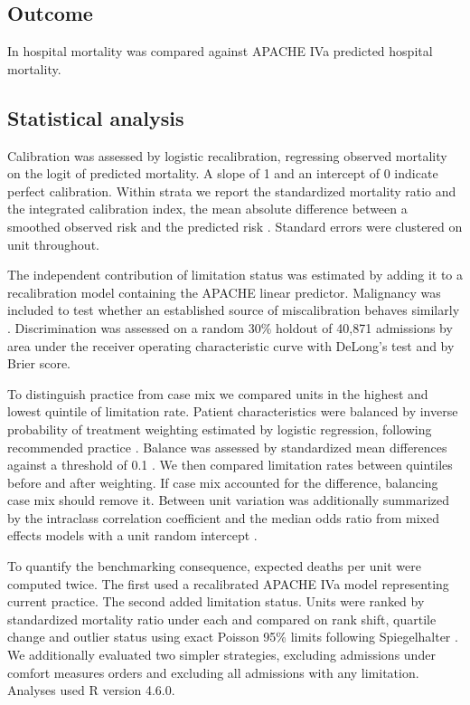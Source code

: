 \documentclass[12pt,a4paper]{article}
\begin{document}
\subsection*{Outcome}
In hospital mortality was compared against APACHE IVa predicted hospital
mortality.

\subsection*{Statistical analysis}
Calibration was assessed by logistic recalibration, regressing observed mortality
on the logit of predicted mortality. A slope of 1 and an intercept of 0 indicate
perfect calibration. Within strata we report the standardized mortality ratio and
the integrated calibration index, the mean absolute difference between a smoothed
observed risk and the predicted risk \cite{ref34,ref35}. Standard errors were
clustered on unit throughout.

The independent contribution of limitation status was estimated by adding it to a
recalibration model containing the APACHE linear predictor. Malignancy was
included to test whether an established source of miscalibration behaves
similarly \cite{ref36}. Discrimination was assessed on a random 30\% holdout of
40{,}871 admissions by area under the receiver operating characteristic curve
with DeLong's test and by Brier score.

To distinguish practice from case mix we compared units in the highest and lowest
quintile of limitation rate. Patient characteristics were balanced by inverse
probability of treatment weighting estimated by logistic regression, following
recommended practice \cite{ref37}. Balance was assessed by standardized mean
differences against a threshold of 0.1 \cite{ref37}. We then compared limitation
rates between quintiles before and after weighting. If case mix accounted for the
difference, balancing case mix should remove it. Between unit variation was
additionally summarized by the intraclass correlation coefficient and the median
odds ratio from mixed effects models with a unit random intercept
\cite{ref38,ref39}.

To quantify the benchmarking consequence, expected deaths per unit were computed
twice. The first used a recalibrated APACHE IVa model representing current
practice. The second added limitation status. Units were ranked by standardized
mortality ratio under each and compared on rank shift, quartile change and
outlier status using exact Poisson 95\% limits following Spiegelhalter
\cite{ref40}. We additionally evaluated two simpler strategies, excluding
admissions under comfort measures orders and excluding all admissions with any
limitation. Analyses used R version 4.6.0.
\end{document}
